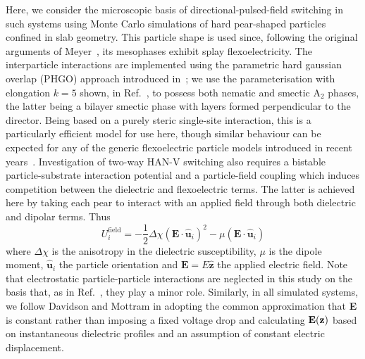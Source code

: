 \documentclass[aps,10pt,twocolumn]{revtex4}
\newcommand{\SmATwo}{smectic A\ensuremath{_2}\xspace}
\newcommand{\mrm}[1]{\ensuremath{\mathrm{#1}}}
\newcommand{\vect}[1]{ \mathbf{#1} }
\newcommand{\vecth}[1]{ \mathbf{\hat{#1} } }
\newcommand{\lp}{\left(}
\newcommand{\rp}{\right)}
\newcommand{\ui}{\vecth{u}_i}
\newcommand{\dotProdP}[2]{ \left( #1 \cdot #2 \right) }
\newcommand{\dotProd}[2]{ #1 \cdot #2 }
\begin{document}
Here, we consider the microscopic basis of directional-pulsed-field switching in such systems using Monte Carlo
simulations of hard pear-shaped particles confined in slab geometry. This particle shape is used since, following
the original arguments of Meyer~\cite{Meyer69}, its mesophases exhibit splay flexoelectricity. The interparticle
interactions are implemented using the parametric hard gaussian overlap (PHGO) approach introduced
in~\cite{BarmesRicci03}; we use the parameterisation with elongation $k=5$ shown, in Ref.~\cite{BarmesRicci03}, to
possess both nematic and \SmATwo phases, the latter being a bilayer smectic phase with layers formed perpendicular
to the director. Being based on a purely steric single-site interaction, this is a particularly efficient model
for use here, though similar behaviour can be expected for any of the generic flexoelectric particle models
introduced in recent years~\cite{Ricci,Pelcovits,Stelzer}. Investigation of two-way HAN-V switching also requires
a bistable particle-substrate interaction potential and a particle-field coupling which induces competition
between the dielectric and flexoelectric terms. The latter is achieved here by taking each pear to interact with
an applied field through both dielectric and dipolar terms. Thus
\begin{equation}
    U_i^\mrm{field} =
    -\frac{1}{2}\Delta\chi\lp \dotProd{\vect{E}}{\ui} \rp^2
    - \mu \dotProdP{\vect{E}}{\ui}
    \label{eqn:field}
\end{equation}
where $\Delta\chi$ is the anisotropy in the dielectric susceptibility, $\mu$ is the dipole moment, $\ui$ the
particle orientation and $\vect{E} = E\vecth{z}$ the applied electric field. Note that electrostatic
particle-particle interactions are neglected in this study on the basis that, as in Ref.~\cite{Ricci}, they play a
minor role. Similarly, in all simulated systems, we follow Davidson and Mottram in adopting the common
approximation that \textbf{E} is constant rather than imposing a fixed voltage drop and calculating $\bf{E}(z)$
based on instantaneous dielectric profiles and an assumption of constant electric displacement.
\end{document}
